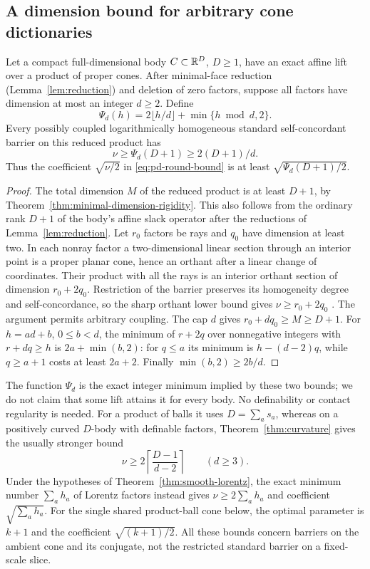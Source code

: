 \subsection{A dimension bound for arbitrary cone dictionaries}
\begin{theorem}
\label{thm:dimension-pd-charge}
Let a compact full-dimensional body $C\subset\mathbb R^D$, $D\geq1$, have
an exact affine lift over a product of proper cones. After minimal-face
reduction (Lemma~\ref{lem:reduction}) and deletion of zero factors, suppose all factors have
dimension at most an integer $d\geq2$. Define
\[
 \Psi_d(h)=2\lfloor h/d\rfloor+\min\{h\bmod d,2\}.
\]
Every possibly coupled logarithmically homogeneous standard
self-concordant barrier on this reduced product has
\begin{equation}\label{eq:dimension-pd-charge}
 \nu\geq\Psi_d(D+1)\geq 2(D+1)/d.
\end{equation}
Thus the coefficient $\sqrt{\nu/2}$ in
\eqref{eq:pd-round-bound} is at least $\sqrt{\Psi_d(D+1)/2}$.
\end{theorem}
\begin{proof}
The total dimension $M$ of the reduced product is at least $D+1$, by
Theorem~\ref{thm:minimal-dimension-rigidity}. This also follows from
the ordinary rank $D+1$ of the body's affine slack operator after
the reductions of Lemma~\ref{lem:reduction}.
Let $r_0$ factors be rays and $q_0$ have dimension at least two.
In each nonray factor a two-dimensional linear section through an
interior point is a proper planar cone, hence an orthant after a linear
change of coordinates. Their product with all the rays is an interior
orthant section of dimension $r_0+2q_0$. Restriction of the barrier
preserves its homogeneity degree and self-concordance, so the sharp
orthant lower bound gives $\nu\geq r_0+2q_0$
\cite{NN1994,Hildebrand2013}. The argument permits arbitrary coupling.
The cap $d$ gives $r_0+dq_0\geq M\geq D+1$.
For $h=ad+b$, $0\leq b<d$, the minimum of $r+2q$ over nonnegative
integers with $r+dq\geq h$ is $2a+\min(b,2)$: for $q\leq a$ its
minimum is $h-(d-2)q$, while $q\geq a+1$ costs at least $2a+2$.
Finally $\min(b,2)\geq2b/d$.
\end{proof}
The function $\Psi_d$ is the exact integer minimum implied by these
two bounds; we do not claim
that some lift attains it for every body. No definability or contact
regularity is needed. For a product of balls it
uses $D=\sum_a s_a$, whereas on a positively curved
$D$-body with definable factors, Theorem~\ref{thm:curvature} gives the
usually stronger bound
\[
 \nu\geq2\left\lceil\frac{D-1}{d-2}\right\rceil
 \qquad(d\geq3).
\]
Under the hypotheses of Theorem~\ref{thm:smooth-lorentz}, the exact
minimum number $\sum_a h_a$ of Lorentz factors instead gives
$\nu\geq2\sum_a h_a$ and coefficient $\sqrt{\sum_a h_a}$.
For the single shared product-ball cone below, the optimal parameter is
$k+1$ and the coefficient $\sqrt{(k+1)/2}$.
All these bounds concern barriers on the ambient cone and its
conjugate, not the restricted standard barrier on a fixed-scale slice.

